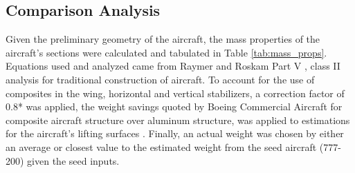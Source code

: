 \subsection{Comparison Analysis}
\label{subsection: comparison}
Given the preliminary geometry of the aircraft, the mass properties of the aircraft's sections were calculated and tabulated in Table \ref{tab:mass_props}. Equations used and analyzed came from Raymer \cite{raymer} and Roskam Part V \cite{roskam_5}, class II analysis for traditional construction of aircraft. To account for the use of composites in the wing, horizontal and vertical stabilizers, a correction factor of 0.8* was applied, the weight savings quoted by Boeing Commercial Aircraft for composite aircraft structure over aluminum structure, was applied to estimations for the aircraft's lifting surfaces \cite{bcacomposite}.  Finally, an actual weight was chosen by either an average or closest value to the estimated weight from the seed aircraft (777-200) given the seed inputs.

